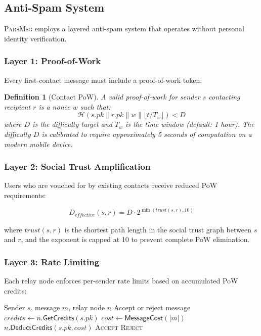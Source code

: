 \documentclass[11pt,a4paper]{article}
\newcommand{\protname}{\textsc{ParsMsg}\xspace}
\newcommand{\HH}{\mathcal{H}}
\newtheorem{definition}{Definition}
\begin{document}
\subsection{Anti-Spam System}

\protname employs a layered anti-spam system that operates without personal identity verification.

\subsubsection{Layer 1: Proof-of-Work}

Every first-contact message must include a proof-of-work token:

\begin{definition}[Contact PoW]
A valid proof-of-work for sender $s$ contacting recipient $r$ is a nonce $w$ such that:
\begin{equation}
    \HH(s.\mathit{pk} \| r.\mathit{pk} \| w \| \lfloor t / T_w \rfloor) < D
\end{equation}
where $D$ is the difficulty target and $T_w$ is the time window (default: 1 hour). The difficulty $D$ is calibrated to require approximately 5 seconds of computation on a modern mobile device.
\end{definition}

\subsubsection{Layer 2: Social Trust Amplification}

Users who are vouched for by existing contacts receive reduced PoW requirements:

\begin{equation}
    D_{\mathit{effective}}(s, r) = D \cdot 2^{\min(\mathit{trust}(s, r), 10)}
\end{equation}

where $\mathit{trust}(s, r)$ is the shortest path length in the social trust graph between $s$ and $r$, and the exponent is capped at 10 to prevent complete PoW elimination.

\subsubsection{Layer 3: Rate Limiting}

Each relay node enforces per-sender rate limits based on accumulated PoW credits:

\begin{algorithm}[H]
\caption{Rate Limit Check}
\label{alg:rate-limit}
\begin{algorithmic}[1]
\Require Sender $s$, message $m$, relay node $n$
\Ensure Accept or reject message
\State $\mathit{credits} \leftarrow n.\mathsf{GetCredits}(s.\mathit{pk})$
\State $\mathit{cost} \leftarrow \mathsf{MessageCost}(|m|)$ 
    \State $n.\mathsf{DeductCredits}(s.\mathit{pk}, \mathit{cost})$
    \State \Return \textsc{Accept}
\Else
    \State \Return \textsc{Reject}
\EndIf
\end{algorithmic}
\end{algorithm}
\end{document}
